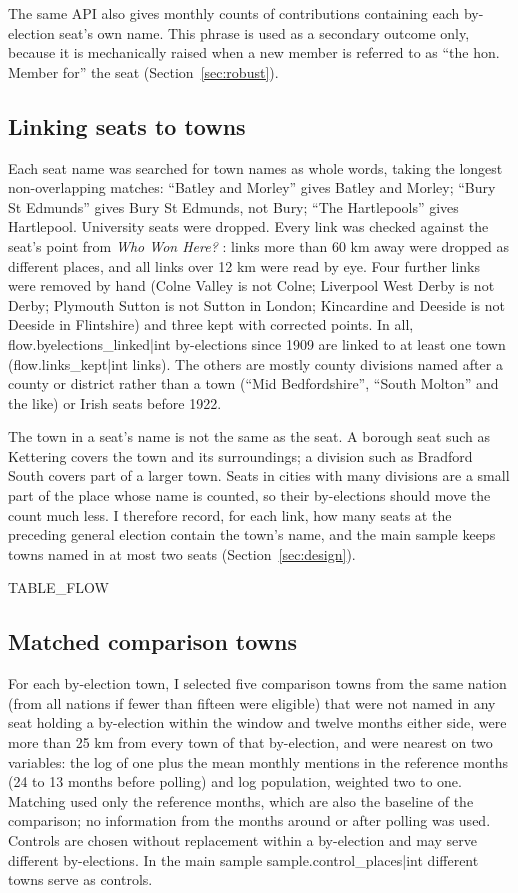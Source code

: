 \documentclass[11pt,a4paper]{article}
\begin{document}
The same API also gives monthly counts of contributions containing each by-election seat's own name. This phrase is used as a secondary outcome only, because it is mechanically raised when a new member is referred to as ``the hon. Member for'' the seat (Section~\ref{sec:robust}).

\subsection{Linking seats to towns}
Each seat name was searched for town names as whole words, taking the longest non-overlapping matches: ``Batley and Morley'' gives Batley and Morley; ``Bury St Edmunds'' gives Bury St Edmunds, not Bury; ``The Hartlepools'' gives Hartlepool. University seats were dropped. Every link was checked against the seat's point from \textit{Who Won Here?} \citep{hotham2026b}: links more than 60 km away were dropped as different places, and all links over 12 km were read by eye. Four further links were removed by hand (Colne Valley is not Colne; Liverpool West Derby is not Derby; Plymouth Sutton is not Sutton in London; Kincardine and Deeside is not Deeside in Flintshire) and three kept with corrected points. In all, {{flow.byelections_linked|int}} by-elections since 1909 are linked to at least one town ({{flow.links_kept|int}} links). The others are mostly county divisions named after a county or district rather than a town (``Mid Bedfordshire'', ``South Molton'' and the like) or Irish seats before 1922.

The town in a seat's name is not the same as the seat. A borough seat such as Kettering covers the town and its surroundings; a division such as Bradford South covers part of a larger town. Seats in cities with many divisions are a small part of the place whose name is counted, so their by-elections should move the count much less. I therefore record, for each link, how many seats at the preceding general election contain the town's name, and the main sample keeps towns named in at most two seats (Section~\ref{sec:design}).

{{TABLE_FLOW}}

\subsection{Matched comparison towns}
For each by-election town, I selected five comparison towns from the same nation (from all nations if fewer than fifteen were eligible) that were not named in any seat holding a by-election within the window and twelve months either side, were more than 25 km from every town of that by-election, and were nearest on two variables: the log of one plus the mean monthly mentions in the reference months (24 to 13 months before polling) and log population, weighted two to one. Matching used only the reference months, which are also the baseline of the comparison; no information from the months around or after polling was used. Controls are chosen without replacement within a by-election and may serve different by-elections. In the main sample {{sample.control_places|int}} different towns serve as controls.
\end{document}
